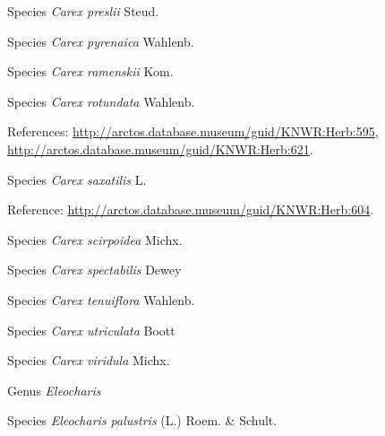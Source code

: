 \documentclass[9pt, article]{memoir}
\begin{document}
\begin{multicols}{2}
\vspace{6pt}\noindent\hspace{36pt}Species \textit{Carex preslii} Steud.


\vspace{6pt}\noindent\hspace{36pt}Species \textit{Carex pyrenaica} Wahlenb.


\vspace{6pt}\noindent\hspace{36pt}Species \textit{Carex ramenskii} Kom.


\vspace{6pt}\noindent\hspace{36pt}Species \textit{Carex rotundata} Wahlenb.


\vspace{6pt}References: 
\url{http://arctos.database.museum/guid/KNWR:Herb:595}, 
\url{http://arctos.database.museum/guid/KNWR:Herb:621}.

\vspace{6pt}\noindent\hspace{36pt}Species \textit{Carex saxatilis} L.


\vspace{6pt}Reference: 
\url{http://arctos.database.museum/guid/KNWR:Herb:604}.

\vspace{6pt}\noindent\hspace{36pt}Species \textit{Carex scirpoidea} Michx.


\vspace{6pt}\noindent\hspace{36pt}Species \textit{Carex spectabilis} Dewey


\vspace{6pt}\noindent\hspace{36pt}Species \textit{Carex tenuiflora} Wahlenb.


\vspace{6pt}\noindent\hspace{36pt}Species \textit{Carex utriculata} Boott


\vspace{6pt}\noindent\hspace{36pt}Species \textit{Carex viridula} Michx.


\vspace{6pt}\noindent\hspace{30pt}Genus \textit{Eleocharis}


\vspace{6pt}\noindent\hspace{36pt}Species \textit{Eleocharis palustris} (L.) Roem. \& Schult.



\end{multicols}
\end{document}
